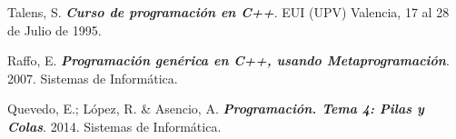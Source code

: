 \begin{thebibliography}{IEEE}
 Talens, S. \textbf{\textit{Curso de programación en C++}}. EUI (UPV) Valencia, 17 al 28 de Julio de 1995. 

 Raffo, E. \textbf{\textit{Programación genérica en C++, usando Metaprogramación}}. 2007. Sistemas de Informática. 

 Quevedo, E.; López, R. \& Asencio, A. \textbf{\textit{Programación. Tema 4: Pilas y Colas}}. 2014. Sistemas de Informática. 

\end{thebibliography}

